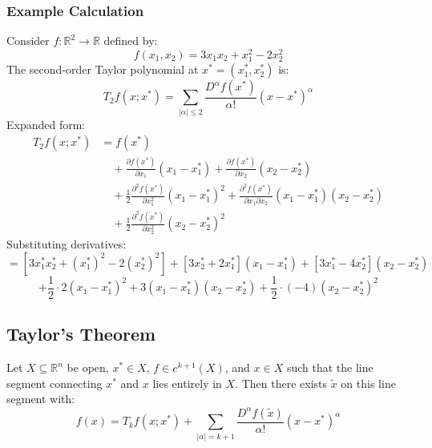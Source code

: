 \documentclass{article}
\begin{document}
\subsubsection*{Example Calculation}
Consider \( f: \mathbb{R}^2 \to \mathbb{R} \) defined by:
\[
f(x_1, x_2) = 3x_1x_2 + x_1^2 - 2x_2^2
\]
The second-order Taylor polynomial at \( x^* = (x_1^*, x_2^*) \) is:
\[
T_2 f(x; x^*) = \sum_{|\alpha| \leq 2} \frac{D^\alpha f(x^*)}{\alpha!} (x - x^*)^\alpha
\]
Expanded form:
\[
\begin{aligned}
T_2 f(x; x^*) &= f(x^*) \\
&\quad + \frac{\partial f(x^*)}{\partial x_1}(x_1 - x_1^*) + \frac{\partial f(x^*)}{\partial x_2}(x_2 - x_2^*) \\
&\quad + \frac{1}{2}\frac{\partial^2 f(x^*)}{\partial x_1^2}(x_1 - x_1^*)^2 + \frac{\partial^2 f(x^*)}{\partial x_1 \partial x_2}(x_1 - x_1^*)(x_2 - x_2^*) \\
&\quad + \frac{1}{2}\frac{\partial^2 f(x^*)}{\partial x_2^2}(x_2 - x_2^*)^2
\end{aligned}
\]
Substituting derivatives:
\[
= \left[3x_1^*x_2^* + (x_1^*)^2 - 2(x_2^*)^2\right] + \left[3x_2^* + 2x_1^*\right](x_1 - x_1^*) + \left[3x_1^* - 4x_2^*\right](x_2 - x_2^*)
\]
\[
+ \frac{1}{2} \cdot 2(x_1 - x_1^*)^2 + 3(x_1 - x_1^*)(x_2 - x_2^*) + \frac{1}{2} \cdot (-4)(x_2 - x_2^*)^2
\]

\subsection*{Taylor's Theorem}
Let \( X \subseteq \mathbb{R}^n \) be open, \( x^* \in X \), \( f \in e^{k+1}(X) \), and \( x \in X \) such that the line segment connecting \( x^* \) and \( x \) lies entirely in \( X \). Then there exists \( \tilde{x} \) on this line segment with:
\[
f(x) = T_k f(x; x^*) + \sum_{|\alpha| = k+1} \frac{D^\alpha f(\tilde{x})}{\alpha!} (x - x^*)^\alpha
\]
\end{document}
